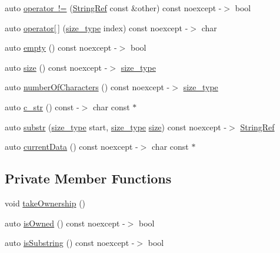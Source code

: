 \begin{DoxyCompactItemize}
\item 
auto \mbox{\hyperlink{class_catch_1_1_string_ref_afbd4abd62af0fc1a35697cbb91415fc6}{operator !=}} (\mbox{\hyperlink{class_catch_1_1_string_ref}{String\+Ref}} const \&other) const noexcept -\/$>$ bool
\item 
auto \mbox{\hyperlink{class_catch_1_1_string_ref_a4ba2e01eec1f0f56c257d213c796ab3b}{operator\mbox{[}$\,$\mbox{]}}} (\mbox{\hyperlink{class_catch_1_1_string_ref_a06b4db8fc82b197004291cf370b2ba7c}{size\+\_\+type}} index) const noexcept -\/$>$ char
\item 
auto \mbox{\hyperlink{class_catch_1_1_string_ref_ac6b68b9dc1e1dec69e884e3f7be581bd}{empty}} () const noexcept -\/$>$ bool
\item 
auto \mbox{\hyperlink{class_catch_1_1_string_ref_ae084d72cb2952cee61a63ef36611d0ad}{size}} () const noexcept -\/$>$ \mbox{\hyperlink{class_catch_1_1_string_ref_a06b4db8fc82b197004291cf370b2ba7c}{size\+\_\+type}}
\item 
auto \mbox{\hyperlink{class_catch_1_1_string_ref_a6a6cac7430e626ffdd7550a081e8168f}{number\+Of\+Characters}} () const noexcept -\/$>$ \mbox{\hyperlink{class_catch_1_1_string_ref_a06b4db8fc82b197004291cf370b2ba7c}{size\+\_\+type}}
\item 
auto \mbox{\hyperlink{class_catch_1_1_string_ref_a1669cb2765e820ca258159676cbd82a5}{c\+\_\+str}} () const -\/$>$ char const $\ast$
\item 
auto \mbox{\hyperlink{class_catch_1_1_string_ref_a248568b467cf6599320903ae613c8eee}{substr}} (\mbox{\hyperlink{class_catch_1_1_string_ref_a06b4db8fc82b197004291cf370b2ba7c}{size\+\_\+type}} start, \mbox{\hyperlink{class_catch_1_1_string_ref_a06b4db8fc82b197004291cf370b2ba7c}{size\+\_\+type}} \mbox{\hyperlink{class_catch_1_1_string_ref_ae084d72cb2952cee61a63ef36611d0ad}{size}}) const noexcept -\/$>$ \mbox{\hyperlink{class_catch_1_1_string_ref}{String\+Ref}}
\item 
auto \mbox{\hyperlink{class_catch_1_1_string_ref_aee240387305ca8b249169d79f36e7002}{current\+Data}} () const noexcept -\/$>$ char const $\ast$
\end{DoxyCompactItemize}
\subsection*{Private Member Functions}
\begin{DoxyCompactItemize}
\item 
void \mbox{\hyperlink{class_catch_1_1_string_ref_aa2723bb1d9355202209993142534d3d6}{take\+Ownership}} ()
\item 
auto \mbox{\hyperlink{class_catch_1_1_string_ref_a911d426c9a979736da4bf44bec2b174c}{is\+Owned}} () const noexcept -\/$>$ bool
\item 
auto \mbox{\hyperlink{class_catch_1_1_string_ref_adee880a214907e6a5ad64141b15f409a}{is\+Substring}} () const noexcept -\/$>$ bool
\end{DoxyCompactItemize}
